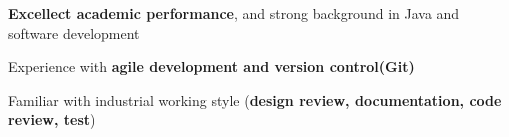 

\begin{cventries}

\vspace{-7mm}

  \cventry
    {}
    {}
    {}
    {}
    {
      \begin{cvitems} %
        \item {\textbf{Excellect academic performance}, and strong background in Java and software development}
        \item {Experience with \textbf{agile development and version control(Git)}}
        \item {Familiar with industrial working style (\textbf{design review, documentation, code review, test})}
      \end{cvitems}
    }
  \vspace{-6mm}

\end{cventries}
